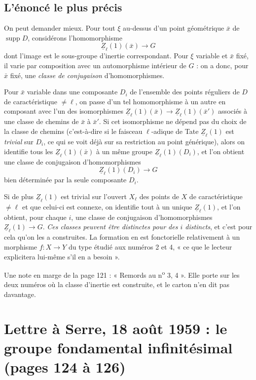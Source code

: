 \documentclass[11pt,a4paper]{article}
\begin{document}
\subsection*{L'énoncé le plus précis}

On peut demander mieux. Pour tout $\xi$ au-dessus d'un point géométrique
$\bar{x}$ de $\operatorname{supp} D$, considérons l'homomorphisme
\[
  \underline{Z}_{\ell}(1)(\bar{x}) \longrightarrow G
\]
dont l'image est le sous-groupe d'inertie correspondant. Pour $\xi$ variable et
$\bar{x}$ fixé, il varie par composition avec un automorphisme intérieur de
$G$ : on a donc, pour $\bar{x}$ fixé, une \emph{classe de conjugaison}
d'homomorphismes.

Pour $\bar{x}$ variable dans une composante $D_{i}$ de l'ensemble des points
réguliers de $D$ de caractéristique $\neq \ell$, on passe d'un tel homomorphisme
à un autre en composant avec l'un des isomorphismes
$\underline{Z}_{\ell}(1)(\bar{x}) \to \underline{Z}_{\ell}(1)(\bar{x}')$
associés à une classe de chemins de $\bar{x}$ à $\bar{x}'$. Si cet isomorphisme
ne dépend pas du choix de la classe de chemins (c'est-à-dire si le faisceau
$\ell$-adique de Tate $\underline{Z}_{\ell}(1)$ est \emph{trivial} sur
$D_{i}$, ce qui se voit déjà sur sa restriction au point générique), alors on
identifie tous les $\underline{Z}_{\ell}(1)(\bar{x})$ à un même groupe
$\underline{Z}_{\ell}(1)(D_{i})$, et l'on obtient une classe de conjugaison
d'homomorphismes
\[
  \underline{Z}_{\ell}(1)(D_{i}) \longrightarrow G
\]
bien déterminée par la seule composante $D_{i}$.

Si de plus $\underline{Z}_{\ell}(1)$ est trivial sur l'ouvert $X_{\ell}$ des
points de $X$ de caractéristique $\neq \ell$ et que celui-ci est connexe, on
identifie tout à un unique $\underline{Z}_{\ell}(1)$, et l'on obtient, pour
chaque $i$, une classe de conjugaison d'homomorphismes
$\underline{Z}_{\ell}(1) \to G$. \emph{Ces classes peuvent être distinctes pour
des $i$ distincts}, et c'est pour cela qu'on les a construites. La
formation en est fonctorielle relativement à un morphisme $f : X \to Y$ du type
étudié aux numéros 2 et 4, « ce que le lecteur explicitera lui-même s'il en a
besoin ».

Une note en marge de la page 121 : « Remords au
n\textsuperscript{o} 3, 4 ». Elle porte sur les deux numéros où la classe
d'inertie est construite, et le carton n'en dit pas davantage.

\section*{Lettre à Serre, 18 août 1959 : le groupe fondamental infinitésimal (pages 124 à 126)}
\end{document}
